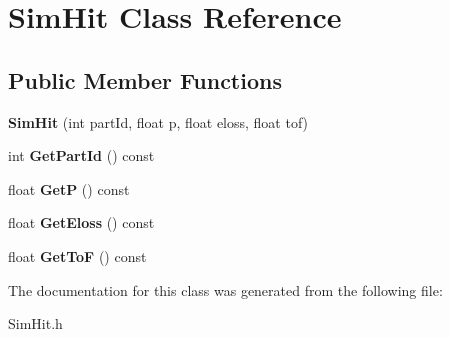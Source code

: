 \hypertarget{class_sim_hit}{}\section{Sim\+Hit Class Reference}
\label{class_sim_hit}
\subsection*{Public Member Functions}
\begin{DoxyCompactItemize}
\item 
\mbox{\label{class_sim_hit_a6832d5f5a28eed709cc93bb43f240da5}} 
{\bfseries Sim\+Hit} (int part\+Id, float p, float eloss, float tof)
\item 
\mbox{\label{class_sim_hit_a9c45eb8a165db3895532d05b2867ef95}} 
int {\bfseries Get\+Part\+Id} () const
\item 
\mbox{\label{class_sim_hit_a8a16bfd2b6fcd17073de2d16f148d6c0}} 
float {\bfseries GetP} () const
\item 
\mbox{\label{class_sim_hit_a4c4c2de8607de3cc7d5c836f8cc36c6b}} 
float {\bfseries Get\+Eloss} () const
\item 
\mbox{\label{class_sim_hit_a50bb06716309d3d601c7f72b247c025e}} 
float {\bfseries Get\+ToF} () const
\end{DoxyCompactItemize}


The documentation for this class was generated from the following file\+:\begin{DoxyCompactItemize}
\item 
Sim\+Hit.\+h\end{DoxyCompactItemize}
